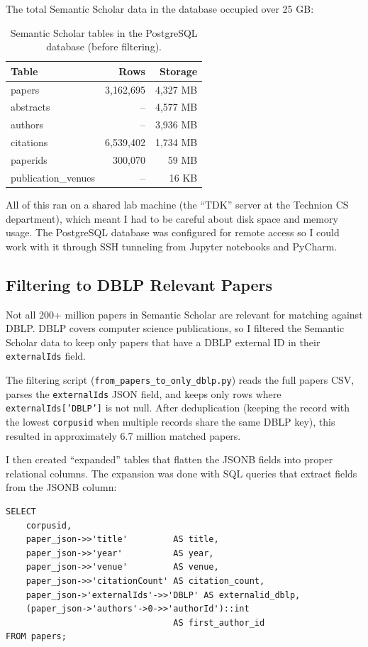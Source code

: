 \documentclass{article}
\begin{document}
The total Semantic Scholar data in the database occupied over 25 GB:

\begin{table}[h!]
\centering
\caption{Semantic Scholar tables in the PostgreSQL database (before filtering).}
\label{tab:s2_tables}
\begin{tabular}{lrr}
\toprule
\textbf{Table} & \textbf{Rows} & \textbf{Storage} \\
\midrule
papers & 3,162,695 & 4,327 MB \\
abstracts & -- & 4,577 MB \\
authors & -- & 3,936 MB \\
citations & 6,539,402 & 1,734 MB \\
paperids & 300,070 & 59 MB \\
publication\_venues & -- & 16 KB \\
\bottomrule
\end{tabular}
\end{table}

All of this ran on a shared lab machine (the ``TDK'' server at the Technion CS department), which meant I had to be careful about disk space and memory usage.
The PostgreSQL database was configured for remote access so I could work with it through SSH tunneling from Jupyter notebooks and PyCharm.

\subsection{Filtering to DBLP Relevant Papers}

Not all 200+ million papers in Semantic Scholar are relevant for matching against DBLP.
DBLP covers computer science publications, so I filtered the Semantic Scholar data to keep only papers that have a DBLP external ID in their \texttt{externalIds} field.

The filtering script (\texttt{from\_papers\_to\_only\_dblp.py}) reads the full papers CSV, parses the \texttt{externalIds} JSON field, and keeps only rows where \texttt{externalIds['DBLP']} is not null.
After deduplication (keeping the record with the lowest \texttt{corpusid} when multiple records share the same DBLP key), this resulted in approximately 6.7 million matched papers.

I then created ``expanded'' tables that flatten the JSONB fields into proper relational columns.
The expansion was done with SQL queries that extract fields from the JSONB column:

\begin{lstlisting}[caption={Expanding JSONB into relational columns (simplified).},label={lst:expand}]
SELECT
    corpusid,
    paper_json->>'title'         AS title,
    paper_json->>'year'          AS year,
    paper_json->>'venue'         AS venue,
    paper_json->>'citationCount' AS citation_count,
    paper_json->'externalIds'->>'DBLP' AS externalid_dblp,
    (paper_json->'authors'->0->>'authorId')::int
                                 AS first_author_id
FROM papers;
\end{lstlisting}
\end{document}
